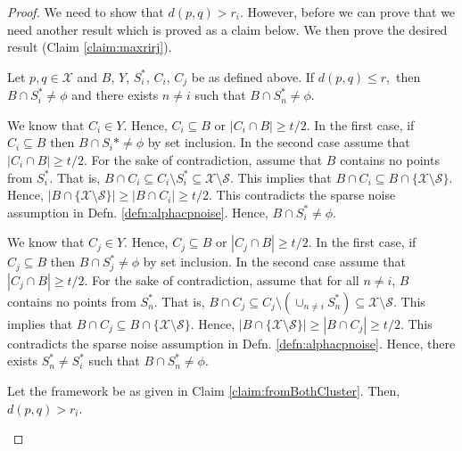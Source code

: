 \documentclass[11pt]{article}
\newcommand{\mc}{\mathcal}
\begin{document}
\begin{proof}
We need to show that $d(p, q) > r_i$. However, before we can prove that we need another result which is proved as a claim below. We then prove the desired result (Claim \ref{claim:maxrirj}).
\begin{claim}
\label{claim:fromBothCluster}
Let $p, q \in \mc X$ and $B$, $Y$, $S_i^*$, $C_i$, $C_j$ be as defined above. If $d(p, q) \le r,$ then $B \cap S_i^* \neq \phi$ and there exists $n \neq i$ such that $B \cap S_n^* \neq \phi$.
\end{claim}
\vspace{-0.1in} We know that $C_i \in Y$. Hence, $C_i \subseteq B$ or $|C_i \cap B| \ge t/2$. In the first case, if $C_i \subseteq B$ then $B \cap S_i* \neq \phi$ by set inclusion. In the second case assume that $|C_i \cap B| \ge t/2$. For the sake of contradiction, assume that $B$ contains no points from $S_i^*$. That is, $B \cap C_i \subseteq C_i \setminus S_i^* \subseteq \mc X \setminus \mc S$. This implies that $B \cap C_i \subseteq B \cap \{\mc X \setminus \mc S\}$. Hence, $|B\cap \{\mc X \setminus \mc S\}| \ge |B \cap C_i| \ge t/2$. This contradicts the sparse noise assumption in Defn. \ref{defn:alphacpnoise}. Hence, $B \cap S_i^* \neq \phi$.

We know that $C_j \in Y$. Hence, $C_j \subseteq B$ or $|C_j \cap B| \ge t/2$. In the first case, if $C_j \subseteq B$ then $B \cap S_j^* \neq \phi$ by set inclusion. In the second case assume that $|C_j \cap B| \ge t/2$. For the sake of contradiction, assume that for all $n \neq i$, $B$ contains no points from $S_n^*$. That is, $B \cap C_j \subseteq C_j \setminus (\cup_{n \neq i} S_n^*) \subseteq \mc X \setminus \mc S$. This implies that $B \cap C_j \subseteq B \cap \{\mc X \setminus \mc S\}$. Hence, $|B\cap \{\mc X \setminus \mc S\}| \ge |B \cap C_j| \ge t/2$. This contradicts the sparse noise assumption in Defn. \ref{defn:alphacpnoise}. Hence, there exists $S_n^* \neq S_i^*$ such that $B \cap S_n^* \neq \phi$.

\begin{claim}
\label{claim:maxrirj}
Let the framework be as given in Claim \ref{claim:fromBothCluster}. Then, $d(p, q) > r_i$.
\end{claim}


\end{proof}
\end{document}
